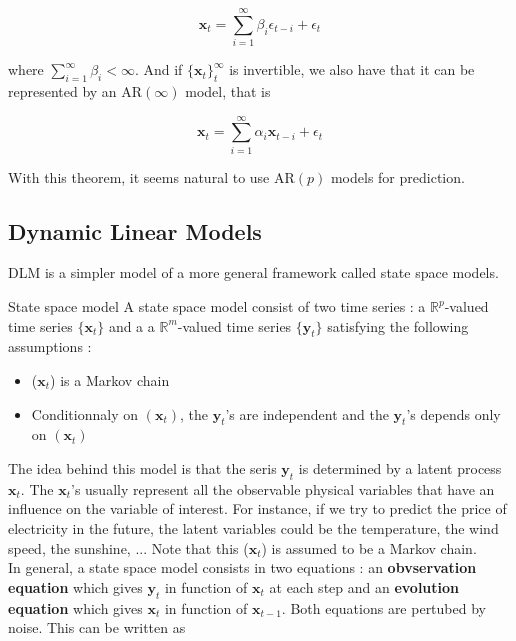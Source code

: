 \documentclass{article}
\begin{document}
$$\mathbf{x}_t = \sum_{i=1}^{\infty} \beta_i \epsilon_{t-i} + \epsilon_t$$

where $\sum_{i=1}^\infty \beta_i < \infty$. And if $\{ \mathbf{x}_t \}_t^\infty$ is invertible, we also have that it can be represented by an AR$(\infty)$ model, that is

$$\mathbf{x}_t = \sum_{i=1}^{\infty} \alpha_i \mathbf{x}_{t-i} + \epsilon_t$$

With this theorem, it seems natural to use AR$(p)$ models for prediction.

\subsection*{Dynamic Linear Models}
DLM is a simpler model of a more general framework called state space models. \\

\begin{definition}{State space model}
A state space model consist of two time series : a $\mathbb{R}^p$-valued time series $\{\mathbf{x}_t\}$ and a a $\mathbb{R}^m$-valued time series $\{\mathbf{y}_t\}$ satisfying the following assumptions :

\begin{itemize}
        \item ($\mathbf{x}_t$) is a Markov chain
        \item Conditionnaly on $(\mathbf{x}_t)$, the $\mathbf{y}_t$'s are independent and the $\mathbf{y}_t$'s depends only on $(\mathbf{x}_t)$
\end{itemize}
\label{statespace}
\end{definition}

The idea behind this model is that the seris $\mathbf{y}_t$ is determined by a latent process $\mathbf{x}_t$. The $\mathbf{x}_t$'s usually represent all the observable physical variables that have an influence on the variable of interest. For instance, if we try to predict the price of electricity in the future, the latent variables could be the temperature, the wind speed, the sunshine, ... Note that this ($\mathbf{x}_t$) is assumed to be a Markov chain. \\

In general, a state space model consists in two equations : an \textbf{obvservation equation} which gives $\mathbf{y}_t$ in function of $\mathbf{x}_t$ at each step and an \textbf{evolution equation} which gives $\mathbf{x}_t$ in function of $\mathbf{x}_{t-1}$. Both equations are pertubed by noise. This can be written as
\end{document}
